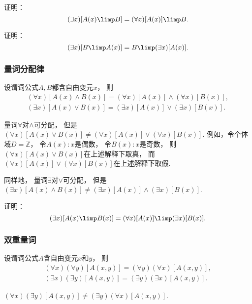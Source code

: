 \begin{example}
证明：\begin{equation}
	(\exists x)[A(x) \limp B]
	= (\forall x)[A(x)] \limp B.
\end{equation}
\end{example}

\begin{example}
证明：\begin{equation}
	(\exists x)[B \limp A(x)]
	= B \limp (\exists x)[A(x)].
\end{equation}
\end{example}

\subsubsection{量词分配律}
设谓词公式\(A,B\)都含自由变元\(x\)，
则\begin{gather}
	(\forall x)[A(x) \land B(x)]
	= (\forall x)[A(x)] \land (\forall x)[B(x)], \\
	(\exists x)[A(x) \lor B(x)]
	= (\exists x)[A(x)] \lor (\exists x)[B(x)].
\end{gather}
\begin{remark}
量词\(\forall\)对\(\land\)可分配，
但是\((\forall x)[A(x) \lor B(x)]
\neq (\forall x)[A(x)] \lor (\forall x)[B(x)]\).
例如，令个体域\(D=\mathbb{Z}\)，
令\(A(x): \text{$x$是偶数}\)，
令\(B(x): \text{$x$是奇数}\)，
则\((\forall x)[A(x) \lor B(x)]\)在上述解释下取真，
而\((\forall x)[A(x)] \lor (\forall x)[B(x)]\)在上述解释下取假.

同样地，
量词\(\exists\)对\(\lor\)可分配，
但是\((\exists x)[A(x) \land B(x)]
\neq (\exists x)[A(x)] \land (\exists x)[B(x)]\).
\end{remark}

\begin{example}
证明：\begin{equation}
	(\exists x)[A(x) \limp B(x)]
	= (\forall x)[A(x)] \limp (\exists x)[B(x)].
\end{equation}
\end{example}

\subsubsection{双重量词}
设谓词公式\(A\)含自由变元\(x\)和\(y\)，
则\begin{gather}
	(\forall x)(\forall y)[A(x,y)]
	= (\forall y)(\forall x)[A(x,y)], \\
	(\exists x)(\exists y)[A(x,y)]
	= (\exists y)(\exists x)[A(x,y)].
\end{gather}
\begin{remark}
\((\forall x)(\exists y)[A(x,y)]
\neq (\exists y)(\forall x)[A(x,y)]\).
\end{remark}

